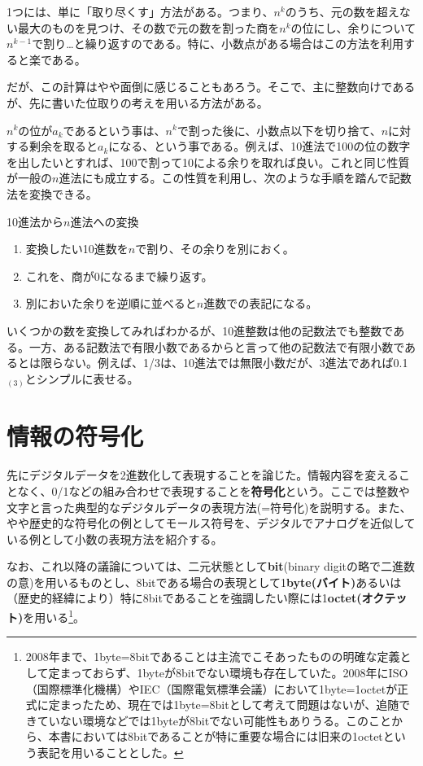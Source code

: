 1つには、単に「取り尽くす」方法がある。つまり、$n^k$のうち、元の数を超えない最大のものを見つけ、その数で元の数を割った商を$n^k$の位にし、余りについて$n^{k-1}$で割り…と繰り返すのである。特に、小数点がある場合はこの方法を利用すると楽である。

だが、この計算はやや面倒に感じることもあろう。そこで、主に整数向けであるが、先に書いた位取りの考えを用いる方法がある。

$n^k$の位が$a_k$であるという事は、$n^k$で割った後に、小数点以下を切り捨て、$n$に対する剰余を取ると$a_k$になる、という事である。例えば、10進法で100の位の数字を出したいとすれば、100で割って10による余りを取れば良い。これと同じ性質が一般の$n$進法にも成立する。この性質を利用し、次のような手順を踏んで記数法を変換できる。
\begin{itembox}[l]{10進法から$n$進法への変換}
\begin{enumerate}
\item 変換したい10進数を$n$で割り、その余りを別におく。
\item これを、商が0になるまで繰り返す。
\item 別においた余りを逆順に並べると$n$進数での表記になる。
\end{enumerate}
\end{itembox}

いくつかの数を変換してみればわかるが、10進整数は他の記数法でも整数である。一方、ある記数法で有限小数であるからと言って他の記数法で有限小数であるとは限らない。例えば、1/3は、10進法では無限小数だが、3進法であれば0.1$_{(3)}$とシンプルに表せる。

\section{情報の符号化}
先にデジタルデータを2進数化して表現することを論じた。情報内容を変えることなく、0/1などの組み合わせで表現することを\textbf{符号化}という。ここでは整数や文字と言った典型的なデジタルデータの表現方法(=符号化)を説明する。また、やや歴史的な符号化の例としてモールス符号を、デジタルでアナログを近似している例として小数の表現方法を紹介する。

なお、これ以降の議論については、二元状態として\textbf{bit}(binary digitの略で二進数の意)を用いるものとし、8bitである場合の表現として1\textbf{byte(バイト)}あるいは（歴史的経緯により）特に8bitであることを強調したい際には1\textbf{octet(オクテット)}を用いる\footnote{2008年まで、1byte=8bitであることは主流でこそあったものの明確な定義として定まっておらず、1byteが8bitでない環境も存在していた。2008年にISO（国際標準化機構）やIEC（国際電気標準会議）において1byte=1octetが正式に定まったため、現在では1byte=8bitとして考えて問題はないが、追随できていない環境などでは1byteが8bitでない可能性もありうる。このことから、本書においては8bitであることが特に重要な場合には旧来の1octetという表記を用いることとした。}。

